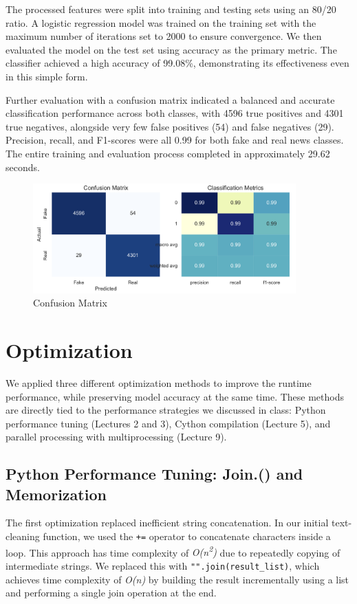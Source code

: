 \documentclass[11pt]{article}
\begin{document}
The processed features were split into training and testing sets using an 80/20 ratio. A logistic regression model was trained on the training set with the maximum number of iterations set to 2000 to ensure convergence. We then evaluated the model on the test set using accuracy as the primary metric. The classifier achieved a high accuracy of 99.08\%, demonstrating its effectiveness even in this simple form.

Further evaluation with a confusion matrix indicated a balanced and accurate classification performance across both classes, with 4596 true positives and 4301 true negatives, alongside very few false positives (54) and false negatives (29). Precision, recall, and F1-scores were all 0.99 for both fake and real news classes. The entire training and evaluation process completed in approximately 29.62 seconds.

\begin{figure}[h]  
  \centering
  \includegraphics[width=0.9\textwidth]{Confusion Matrix.png} 
  \caption{Confusion Matrix}
  \label{fig:myplot}
\end{figure}

\section{Optimization}
We applied three different optimization methods to improve the runtime performance, while preserving model accuracy at the same time. These methods are directly tied to the performance strategies we discussed in class: Python performance tuning (Lectures 2 and 3), Cython compilation (Lecture 5), and parallel processing with multiprocessing (Lecture 9).

\subsection{Python Performance Tuning: Join.() and Memorization}

The first optimization replaced inefficient string concatenation. In our initial text-cleaning function, we used the \texttt{+=} operator to concatenate characters inside a loop. This approach has time complexity of \textit{O(n\textsuperscript{2})} due to repeatedly copying of intermediate strings. We replaced this with \texttt{"".join(result\_list)}, which achieves time complexity of \textit{O(n)} by building the result incrementally using a list and performing a single join operation at the end.
\end{document}
